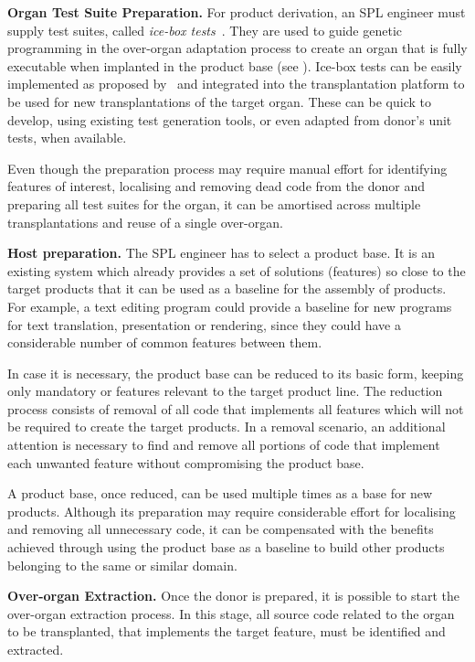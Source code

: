 \textbf{Organ Test Suite Preparation.} For product derivation, an SPL engineer must supply test suites, called \emph{ice-box tests}~\cite{Barr2015}. They are used to guide genetic programming in the over-organ adaptation process to create an organ that is fully executable when implanted in the product base (see ). 
Ice-box tests can be easily implemented as proposed by~\cite{Barr2015} and integrated into the transplantation platform to be used for new transplantations of the target organ. 
These can be quick to develop, using existing test generation tools, or even adapted from donor’s unit tests, when available.

Even though the preparation process may require manual effort for identifying features of interest,  localising and removing  dead code from the donor and preparing all test suites for the organ, it can be amortised across multiple transplantations and reuse of a single over-organ.

\textbf{Host preparation.} The SPL engineer has to select a product base. It is an existing system which already provides a set of solutions (features) so close to the target products that it can be used as a baseline for the assembly of products. For example, a text editing program could provide a baseline for new programs for text translation,  presentation or rendering, since they could have a considerable number of common features between them.

In case it is necessary, the product base can be reduced to its basic form, keeping only mandatory or features relevant to the target product line. The reduction process consists of removal of all code that implements all features which will not be required to create the target products. In a removal scenario, an additional attention is necessary to find and remove all portions of code that implement each unwanted feature without compromising the product base.

A product base, once reduced, can be used multiple times as a base for new products. Although its preparation may require considerable effort for localising and removing all unnecessary code, it can be compensated with the benefits achieved through using the product base as a baseline to build other products belonging to the same or similar domain.

\textbf{Over-organ Extraction.} Once the donor is prepared, it is possible to start the over-organ extraction process. In this stage,  all source code related to the organ to be transplanted, that implements the target feature, must be identified and extracted. 

